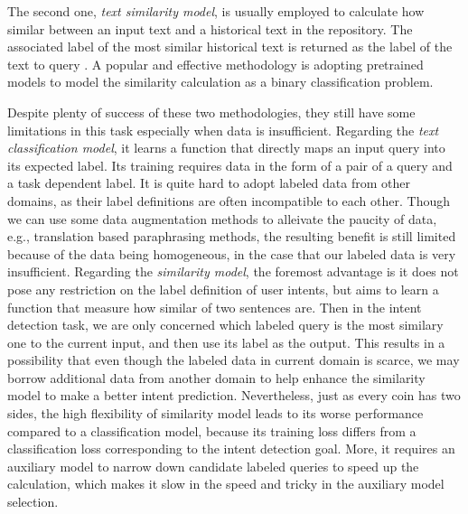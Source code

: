 The  second  one, \emph{text similarity model}, is usually employed to calculate how  similar  between an input text and a historical text in the repository. 
The associated label of the most similar historical text is returned as the label of the  text  to  query \cite{jafarpour2010filter,   leuski2011npceditor}.  
A  popular  and  effective  methodology  is adopting pretrained models to model the similarity calculation as a binary classification problem.

Despite  plenty of success  of  these two methodologies, they still have some limitations in this task especially when data is insufficient.
Regarding  the  \emph{text  classification  model}, it learns a function that directly maps an input query into its expected label.
Its training requires data in the form of a pair of  a query and a task dependent label. 
It is quite hard to adopt labeled data from other domains, as their label definitions are often incompatible to each other. 
Though we can use some data augmentation methods to alleivate the paucity of data,  e.g., translation based paraphrasing methods, the resulting benefit is still limited because of the data being homogeneous, in the case that our labeled data is very insufficient.
Regarding the  \emph{similarity model}, the foremost advantage is it does not pose any restriction on the label definition of user intents, but aims to learn a function that measure how similar of two sentences are. 
Then in the intent detection task, we are only concerned which labeled query is the most similary one to the current input, and then use its label as the output.
This results in a possibility that even though the labeled data in current domain is scarce, we may borrow additional data from another domain to help enhance the similarity model to make a better intent prediction.
Nevertheless, just as every coin has two sides, the high flexibility of similarity model leads to its worse performance compared to a classification model,  because its training loss differs from a classification loss corresponding to the intent detection goal.
More, it requires an auxiliary model to narrow down candidate labeled queries to speed up the calculation, which makes it slow in the speed and tricky in the auxiliary model selection. 

